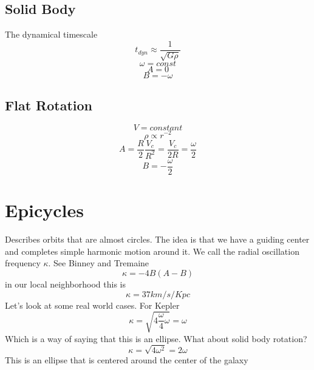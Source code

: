 \subsection{Solid Body}
The dynamical timescale 
\begin{equation}
t_{dyn} \approx \frac{1}{\sqrt{G\rho}}
\end{equation}
\begin{equation}
\omega = const
\end{equation}
\begin{equation}
A = 0
\end{equation} 
\begin{equation}
B = -\omega
\end{equation}


\subsection{Flat Rotation}
\begin{equation}
V = constant
\end{equation}
\begin{equation}
\rho \propto r^{-2}
\end{equation}
\begin{equation}
A = \frac{R}{2} \frac{V_c}{R^2} = \frac{V_c}{2R} = \frac{\omega}{2}
\end{equation}
\begin{equation}
B = -\frac{\omega}{2}
\end{equation}

\section{Epicycles}
Describes orbits that are almost circles. The idea is that we have a guiding center and completes simple harmonic motion around it. We call the radial oscillation frequency $\kappa$. See Binney and Tremaine
\begin{equation}
\kappa = -4B(A-B)
\end{equation}
in our local neighborhood this is
\begin{equation}
\kappa = 37 km/s/Kpc
\end{equation}
Let's look at some real world cases. For Kepler
\begin{equation}
\kappa = \sqrt{4\frac{\omega}{4} \omega} = \omega
\end{equation}
Which is a way of saying that this is an ellipse. What about solid body rotation?
\begin{equation}
\kappa = \sqrt{4\omega^2} = 2\omega
\end{equation}
This is an ellipse that is centered around the center of the galaxy

